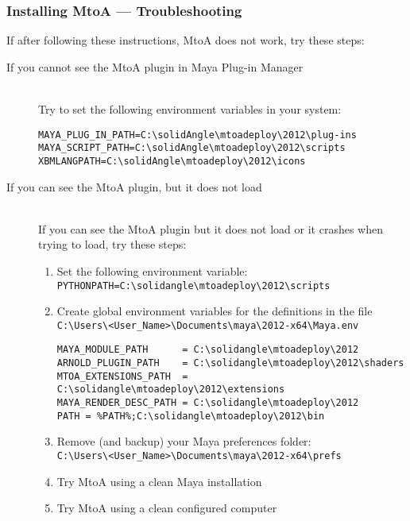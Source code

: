 \subsubsection{Installing MtoA --- Troubleshooting}
If after following these instructions, MtoA does not work, try these steps:

\begin{description}

\item[If you cannot see the MtoA plugin in Maya Plug-in Manager] \hfill \\
Try to set the following environment variables in your system:
{\footnotesize \begin{verbatim}
MAYA_PLUG_IN_PATH=C:\solidAngle\mtoadeploy\2012\plug-ins
MAYA_SCRIPT_PATH=C:\solidAngle\mtoadeploy\2012\scripts
XBMLANGPATH=C:\solidAngle\mtoadeploy\2012\icons
\end{verbatim}}

\item[If you can see the MtoA plugin, but it does not load] \hfill \\
If you can see the MtoA plugin but it does not load or it crashes when trying to load, try these steps:
\begin{enumerate}
\item Set the following environment variable:\\
\verb|PYTHONPATH=C:\solidangle\mtoadeploy\2012\scripts|

\item Create global environment variables for the definitions in the file\\
\verb|C:\Users\<User_Name>\Documents\maya\2012-x64\Maya.env|\\

{\footnotesize \begin{verbatim}
MAYA_MODULE_PATH      = C:\solidangle\mtoadeploy\2012
ARNOLD_PLUGIN_PATH    = C:\solidangle\mtoadeploy\2012\shaders
MTOA_EXTENSIONS_PATH  = C:\solidangle\mtoadeploy\2012\extensions
MAYA_RENDER_DESC_PATH = C:\solidangle\mtoadeploy\2012
PATH = %PATH%;C:\solidangle\mtoadeploy\2012\bin
\end{verbatim}}

\item Remove (and backup) your Maya preferences folder:\\
\verb|C:\Users\<User_Name>\Documents\maya\2012-x64\prefs|

\item Try MtoA using a clean Maya installation

\item Try MtoA using a clean configured computer

\end{enumerate}

\end{description}

